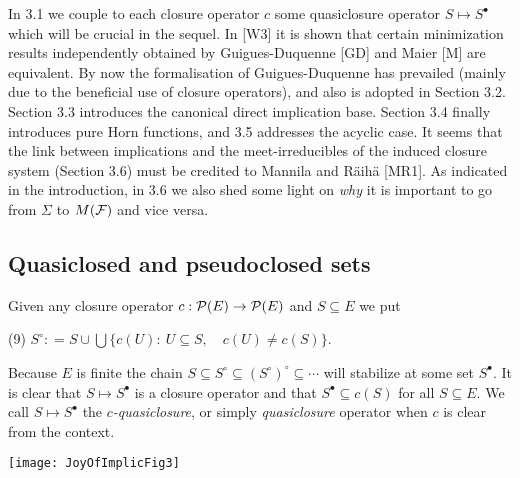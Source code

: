 \documentclass[11pt]{article}
\newcommand{\ra}{\rightarrow}
\begin{document}
In 3.1 we couple to each closure operator $c$ some quasiclosure operator $S \mapsto S^\bullet$  which will be crucial in the sequel. In [W3] it is shown that certain minimization results independently obtained by Guigues-Duquenne [GD] and Maier [M] are equivalent. By now the formalisation of Guigues-Duquenne has prevailed (mainly due to the beneficial use of closure operators), and also is adopted in Section 3.2. Section 3.3 introduces the canonical direct implication base. Section 3.4 finally introduces pure Horn functions, and 3.5 addresses the acyclic case. 
It seems that the link between implications and the meet-irreducibles of the induced closure system (Section 3.6) must be credited to Mannila and R\"{a}ih\"{a} [MR1]. As indicated in the introduction, in 3.6 we also shed some light on {\it why} it is important to go from $\Sigma$ to $M({\cal F})$ and vice versa.


\subsection{Quasiclosed and pseudoclosed sets}

Given any closure operator $c: {\cal P}(E) \ra {\cal P}(E)$ and $S \subseteq E$ we put 

(9) \quad $S^\circ : = S \cup \bigcup \{c(U): \ U \subseteq S,\quad c(U) \neq c(S) \}$.

Because $E$ is finite the chain $S \subseteq S^\circ \subseteq (S^\circ)^\circ \subseteq \cdots$ will stabilize at some set $S^\bullet$. It is clear that $S \mapsto S^\bullet$ is  a closure operator and that $S^\bullet \subseteq c(S)$ for all $S \subseteq E$. We call $S \mapsto S^\bullet$ the $c${\it -quasiclosure}, or simply {\it quasiclosure} operator when $c$ is clear from the context.


\texttt{[image: JoyOfImplicFig3]}
\end{document}
